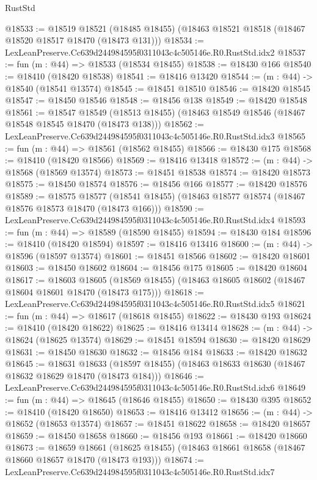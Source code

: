\begin{lexlean}{RustStd}
\begin{coremodule}
@18533 := @18519
    @18521
    (@18485 @18455)
    (@18463 @18521 @18518 (@18467 @18520 @18517 @18470 (@18473 @131)))
@18534 := LexLeanPreserve.Cc639d244984595f0311043c4c505146e.R0.RustStd.idx2
@18537 := fun (m : @44) => @18533 (@18534 @18455)
@18538 := @18430 @166
@18540 := @18410 (@18420 @18538)
@18541 := @18416 @13420
@18544 := (m : @44) -> @18540 (@18541 @13574)
@18545 := @18451 @18510
@18546 := @18420 @18545
@18547 := @18450 @18546
@18548 := @18456 @138
@18549 := @18420 @18548
@18561 := @18547
    @18549
    (@18513 @18455)
    (@18463 @18549 @18546 (@18467 @18548 @18545 @18470 (@18473 @138)))
@18562 := LexLeanPreserve.Cc639d244984595f0311043c4c505146e.R0.RustStd.idx3
@18565 := fun (m : @44) => @18561 (@18562 @18455)
@18566 := @18430 @175
@18568 := @18410 (@18420 @18566)
@18569 := @18416 @13418
@18572 := (m : @44) -> @18568 (@18569 @13574)
@18573 := @18451 @18538
@18574 := @18420 @18573
@18575 := @18450 @18574
@18576 := @18456 @166
@18577 := @18420 @18576
@18589 := @18575
    @18577
    (@18541 @18455)
    (@18463 @18577 @18574 (@18467 @18576 @18573 @18470 (@18473 @166)))
@18590 := LexLeanPreserve.Cc639d244984595f0311043c4c505146e.R0.RustStd.idx4
@18593 := fun (m : @44) => @18589 (@18590 @18455)
@18594 := @18430 @184
@18596 := @18410 (@18420 @18594)
@18597 := @18416 @13416
@18600 := (m : @44) -> @18596 (@18597 @13574)
@18601 := @18451 @18566
@18602 := @18420 @18601
@18603 := @18450 @18602
@18604 := @18456 @175
@18605 := @18420 @18604
@18617 := @18603
    @18605
    (@18569 @18455)
    (@18463 @18605 @18602 (@18467 @18604 @18601 @18470 (@18473 @175)))
@18618 := LexLeanPreserve.Cc639d244984595f0311043c4c505146e.R0.RustStd.idx5
@18621 := fun (m : @44) => @18617 (@18618 @18455)
@18622 := @18430 @193
@18624 := @18410 (@18420 @18622)
@18625 := @18416 @13414
@18628 := (m : @44) -> @18624 (@18625 @13574)
@18629 := @18451 @18594
@18630 := @18420 @18629
@18631 := @18450 @18630
@18632 := @18456 @184
@18633 := @18420 @18632
@18645 := @18631
    @18633
    (@18597 @18455)
    (@18463 @18633 @18630 (@18467 @18632 @18629 @18470 (@18473 @184)))
@18646 := LexLeanPreserve.Cc639d244984595f0311043c4c505146e.R0.RustStd.idx6
@18649 := fun (m : @44) => @18645 (@18646 @18455)
@18650 := @18430 @395
@18652 := @18410 (@18420 @18650)
@18653 := @18416 @13412
@18656 := (m : @44) -> @18652 (@18653 @13574)
@18657 := @18451 @18622
@18658 := @18420 @18657
@18659 := @18450 @18658
@18660 := @18456 @193
@18661 := @18420 @18660
@18673 := @18659
    @18661
    (@18625 @18455)
    (@18463 @18661 @18658 (@18467 @18660 @18657 @18470 (@18473 @193)))
@18674 := LexLeanPreserve.Cc639d244984595f0311043c4c505146e.R0.RustStd.idx7

\end{coremodule}
\end{lexlean}
